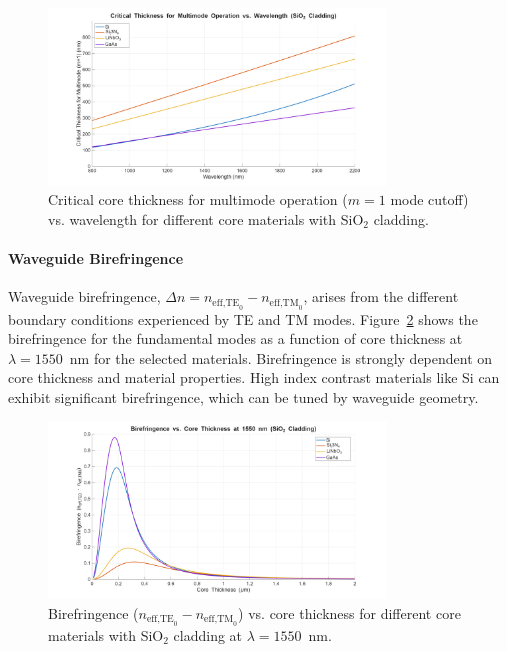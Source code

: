 \documentclass[10pt, a4paper]{article}
\begin{document}
\begin{figure}[h!]
    \centering
    \includegraphics[width=0.8\textwidth]{task1/critical_thickness_multimode_vs_wavelength_materials.png}
    \caption{Critical core thickness for multimode operation ($m=1$ mode cutoff) vs. wavelength for different core materials with SiO$_2$ cladding.}
    \label{fig:critical_thickness_multimode_vs_wavelength_materials}
\end{figure}

\paragraph{Waveguide Birefringence}
Waveguide birefringence, $\Delta n = n_{\text{eff,TE}_0} - n_{\text{eff,TM}_0}$, arises from the different boundary conditions experienced by TE and TM modes. Figure~\ref{fig:birefringence_vs_thickness_materials_1550nm} shows the birefringence for the fundamental modes as a function of core thickness at $\lambda = 1550$~nm for the selected materials. Birefringence is strongly dependent on core thickness and material properties. High index contrast materials like Si can exhibit significant birefringence, which can be tuned by waveguide geometry.

\begin{figure}[h!]
    \centering
    \includegraphics[width=0.8\textwidth]{task1/birefringence_vs_thickness_materials_1550nm.png}
    \caption{Birefringence ($n_{\text{eff,TE}_0} - n_{\text{eff,TM}_0}$) vs. core thickness for different core materials with SiO$_2$ cladding at $\lambda = 1550$~nm.}
    \label{fig:birefringence_vs_thickness_materials_1550nm}
\end{figure}
\end{document}
